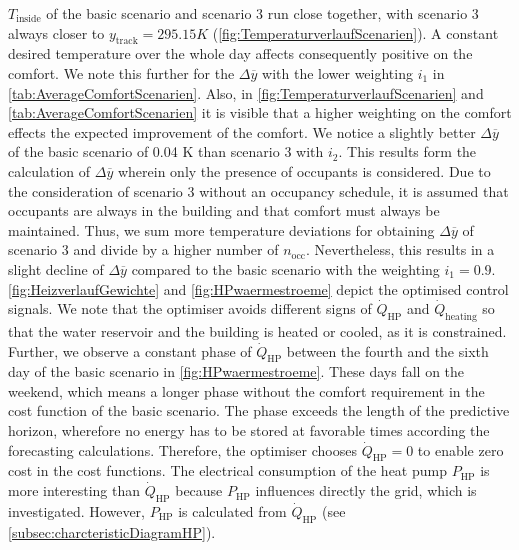 $T_\text{inside}$ of the basic scenario and scenario 3 run close together, with scenario 3 always closer to $y_\text{track} = 295.15 K$ (\autoref{fig:TemperaturverlaufScenarien}). A constant desired temperature over the whole day affects consequently positive on the comfort. We note this further for the $\Delta \overline{y}$ with the lower weighting $i_\text{1}$ in \autoref{tab:AverageComfortScenarien}. Also, in \autoref{fig:TemperaturverlaufScenarien} and \autoref{tab:AverageComfortScenarien} it is visible that a higher weighting on the comfort effects the expected improvement of the comfort. We notice a slightly better $\Delta \overline{y}$ of the basic scenario of 0.04 K than scenario 3 with $i_\text{2}$. This results form the calculation of $\Delta \overline{y}$ wherein only the presence of occupants is considered. Due to the consideration of scenario 3 without an occupancy schedule, it is assumed that occupants are always in the building and that comfort must always be maintained. Thus, we sum more temperature deviations for obtaining $\Delta \overline{y}$ of scenario 3 and divide by a higher number of $n_\text{occ}$. Nevertheless, this results in a slight decline of $\Delta \overline{y}$ compared to the basic scenario with the weighting $i_\text{1} = 0.9$. \newline 
\autoref{fig:HeizverlaufGewichte} and \autoref{fig:HPwaermestroeme} depict the optimised control signals. We note that the optimiser avoids different signs of $\dot{Q}_\text{HP}$ and $\dot{Q}_\text{heating}$ so that the water reservoir and the building is heated or cooled, as it is constrained. Further, we observe a constant phase of $\dot{Q}_\text{HP}$ between the fourth and the sixth day of the basic scenario in \autoref{fig:HPwaermestroeme}. These days fall on the weekend, which means a longer phase without the comfort requirement in the cost function of the basic scenario. The phase exceeds the length of the predictive horizon, wherefore no energy has to be stored at favorable times according the forecasting calculations. Therefore, the optimiser chooses $\dot{Q}_\text{HP} = 0$ to enable zero cost in the cost functions.\newline
The electrical consumption of the heat pump $P_\text{HP}$ is more interesting than $\dot{Q}_\text{HP}$ because $P_\text{HP}$ influences directly the grid, which is investigated. However, $P_\text{HP}$ is calculated from $\dot{Q}_\text{HP}$ (see \autoref{subsec:charcteristicDiagramHP}).\newline
